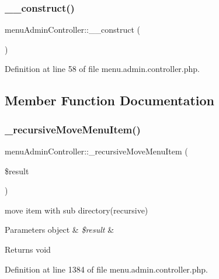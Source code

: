 \subsubsection{\texorpdfstring{\+\_\+\+\_\+construct()}{\_\_construct()}}
{\footnotesize\ttfamily menu\+Admin\+Controller\+::\+\_\+\+\_\+construct (\begin{DoxyParamCaption}{ }\end{DoxyParamCaption})}



Definition at line 58 of file menu.\+admin.\+controller.\+php.



\subsection{Member Function Documentation}
\hypertarget{classmenuAdminController_a663ff3838dde914ecaa1cd2875ce6848}{}\label{classmenuAdminController_a663ff3838dde914ecaa1cd2875ce6848} 
\subsubsection{\texorpdfstring{\+\_\+recursive\+Move\+Menu\+Item()}{\_recursiveMoveMenuItem()}}
{\footnotesize\ttfamily menu\+Admin\+Controller\+::\+\_\+recursive\+Move\+Menu\+Item (\begin{DoxyParamCaption}\item[{}]{\$result }\end{DoxyParamCaption})}

move item with sub directory(recursive) 
\begin{DoxyParams}[1]{Parameters}
object & {\em \$result} & \\
\hline
\end{DoxyParams}
\begin{DoxyReturn}{Returns}
void 
\end{DoxyReturn}


Definition at line 1384 of file menu.\+admin.\+controller.\+php.

\hypertarget{classmenuAdminController_a0eee3e8dfe3a4f9af9bd76f4776951cb}{}\label{classmenuAdminController_a0eee3e8dfe3a4f9af9bd76f4776951cb} 

